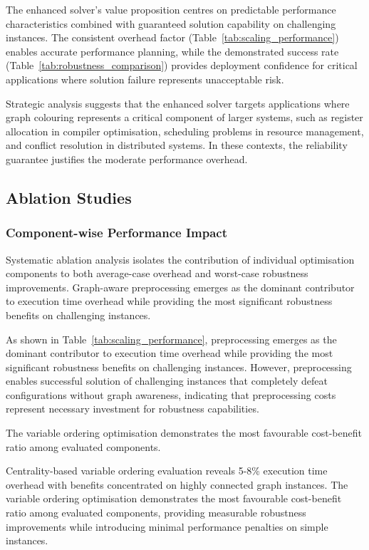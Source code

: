 The enhanced solver's value proposition centres on predictable performance characteristics combined with guaranteed solution capability on challenging instances. The consistent overhead factor (Table~\ref{tab:scaling_performance}) enables accurate performance planning, while the demonstrated success rate (Table~\ref{tab:robustness_comparison}) provides deployment confidence for critical applications where solution failure represents unacceptable risk.

Strategic analysis suggests that the enhanced solver targets applications where graph colouring represents a critical component of larger systems, such as register allocation in compiler optimisation, scheduling problems in resource management, and conflict resolution in distributed systems. In these contexts, the reliability guarantee justifies the moderate performance overhead.

\subsection{Ablation Studies}

\subsubsection{Component-wise Performance Impact}

Systematic ablation analysis isolates the contribution of individual optimisation components to both average-case overhead and worst-case robustness improvements. Graph-aware preprocessing emerges as the dominant contributor to execution time overhead while providing the most significant robustness benefits on challenging instances.

As shown in Table~\ref{tab:scaling_performance}, preprocessing emerges as the dominant contributor to execution time overhead while providing the most significant robustness benefits on challenging instances. However, preprocessing enables successful solution of challenging instances that completely defeat configurations without graph awareness, indicating that preprocessing costs represent necessary investment for robustness capabilities.

The variable ordering optimisation demonstrates the most favourable cost-benefit ratio among evaluated components.

Centrality-based variable ordering evaluation reveals 5-8\% execution time overhead with benefits concentrated on highly connected graph instances. The variable ordering optimisation demonstrates the most favourable cost-benefit ratio among evaluated components, providing measurable robustness improvements while introducing minimal performance penalties on simple instances.

